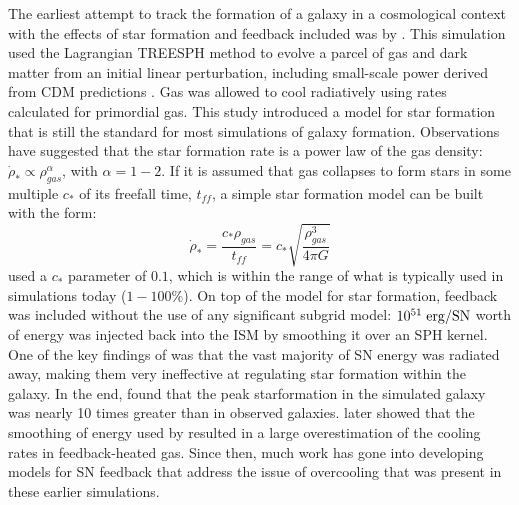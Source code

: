 The earliest attempt to track the formation of a galaxy in a cosmological
context with the effects of star formation and feedback included was by
\citet{Katz1992}.  This simulation used the Lagrangian TREESPH method
\citep{Hernquist1989} to evolve a parcel of gas and dark matter from an initial
linear perturbation, including small-scale power derived from CDM predictions
\citep{Zeldovich1970,Peebles1982}.
Gas was allowed to cool radiatively using rates calculated for primordial gas.
This study introduced a model for star formation that is still the standard for
most simulations of galaxy formation.  Observations \citep{Schmidt1959} have
suggested that the star formation rate is a power law of the gas density:
$\dot\rho_*\propto\rho_{gas}^\alpha$, with $\alpha=1-2$.  If it is assumed that
gas collapses to form stars in some multiple $c_*$ of its freefall time,
$t_{ff}$, a simple star formation model can be built with the form:
\begin{equation}
    \dot\rho_* = \frac{c_*\rho_{gas}}{t_{ff}} = c_*\sqrt{\frac{\rho^3_{gas}}{4\pi G}}
\end{equation}
\citet{Katz1992} used a $c_*$ parameter of $0.1$, which is within the range of
what is typically used in simulations today ($1-100\%$).  On top of the model
for star formation, feedback was included without the use of any significant
subgrid model:  $10^{51}\;\rm{erg/SN}$ worth of energy was injected back into
the ISM by smoothing it over an SPH kernel.  One of the key findings of
\citet{Katz1992} was that the vast majority of SN energy was radiated away,
making them very ineffective at regulating star formation within the galaxy.  In
the end, \citet{Katz1992} found that the peak starformation in the simulated galaxy was
nearly 10 times greater than in observed galaxies.  \citet{Thacker2000} later
showed that the smoothing of energy used by \citet{Katz1992} resulted in a large
overestimation of the cooling rates in feedback-heated gas. Since then,
much work has gone into developing models for SN feedback that address the issue
of overcooling that was present in these earlier simulations.

